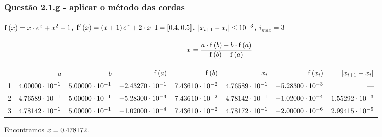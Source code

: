 \begin{frame}
\frametitle{Questão 2.1.g - aplicar o método das cordas }
\framesubtitle{$\mathrm{f}\left(x\right) = x \cdot e^x + x^2 - 1$,
$\mathrm{f}'\left(x\right) = \left(x + 1\right)e^x + 2 \cdot x$ 
$\mathrm{I} = [0.4,0.5]$, $|x_{i+1} - x_i| \leq 10^{-3}$, $i_{max} = 3$}

\[
x = \frac{a \cdot \mathrm{f}\left(b\right) - b \cdot
\mathrm{f}\left(a\right)}{\mathrm{f}\left(b\right) - \mathrm{f}\left(a\right)}
\]

{\tiny
\begin{center}
\begin{tabular}{r|r|r|r|r|r|r|r}
  & 
  $a$ & 
  $b$ &
  $\mathrm{f}\left(a\right)$ &
  $\mathrm{f}\left(b\right)$ &
  $x_i$ &
  $\mathrm{f}\left(x_i\right)$ &
  $|x_{i+1} - x_i|$
\\
\hline
\hline
  1 &
  $4.00000 \cdot 10^{-1}$ &
  $5.00000 \cdot 10^{-1}$ &
  $-2.43270 \cdot 10^{-1}$&
  $7.43610 \cdot 10^{-2}$&
  $4.76589 \cdot 10^{-1}$ &
  $-5.28300 \cdot 10^{-3}$&
  ---\\
\hline
  2 &
  $4.76589 \cdot 10^{-1}$&
  $5.00000 \cdot 10^{-1}$ &
  $-5.28300 \cdot 10^{-3}$ &
  $7.43610 \cdot 10^{-2}$ &
  $4.78142 \cdot 10^{-1}$ &
  $-1.02000 \cdot 10^{-4}$ &
  $1.55292 \cdot 10^{-3}$\\
\hline
  3 &
  $4.78142 \cdot 10^{-1}$&
  $5.00000 \cdot 10^{-1}$ &
  $-1.02000 \cdot 10^{-4}$ &
  $7.43610 \cdot 10^{-2}$ &
  $4.78172 \cdot 10^{-1}$ &
  $-2.00000 \cdot 10^{-6}$ &
  $2.99415 \cdot 10^{-5}$\\
\hline
\end{tabular}
\end{center}
}

Encontramos $x = 0.478172$.

\end{frame}

